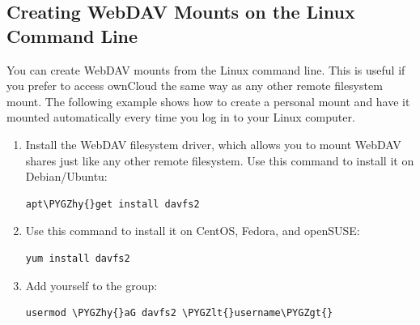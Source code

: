 \documentclass[letterpaper,10pt,english]{sphinxmanual}
\def\PYGZlt{\char`\<}
\def\PYGZgt{\char`\>}
\def\PYGZhy{\char`\-}
\begin{document}
\subsection{Creating WebDAV Mounts on the Linux Command Line}
\label{files/access_webdav:creating-webdav-mounts-on-the-linux-command-line}
You can create WebDAV mounts from the Linux command line. This is useful if you
prefer to access ownCloud the same way as any other remote filesystem mount.
The following example shows how to create a personal mount and have it mounted
automatically every time you log in to your Linux computer.
\begin{enumerate}
\item {} 
Install the  WebDAV filesystem driver, which allows you to mount
WebDAV shares just like any other remote filesystem. Use this command to
install it on Debian/Ubuntu:

\begin{Verbatim}[commandchars=\\\{\}]
apt\PYGZhy{}get install davfs2
\end{Verbatim}

\item {} 
Use this command to install it on CentOS, Fedora, and openSUSE:

\begin{Verbatim}[commandchars=\\\{\}]
yum install davfs2
\end{Verbatim}

\item {} 
Add yourself to the  group:

\begin{Verbatim}[commandchars=\\\{\}]
usermod \PYGZhy{}aG davfs2 \PYGZlt{}username\PYGZgt{}
\end{Verbatim}

\end{enumerate}
\end{document}
